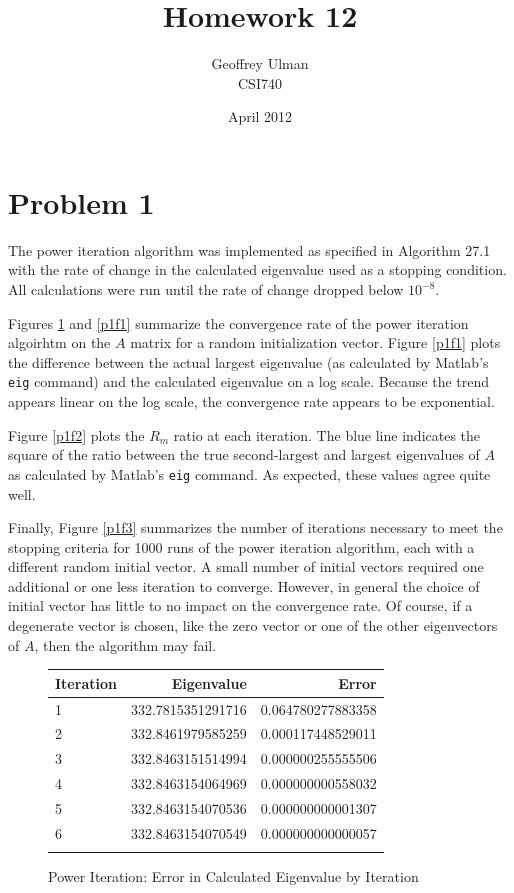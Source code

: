 \documentclass{article}
\begin{document}
\title{Homework 12}
\author{Geoffrey Ulman\\
        CSI740}
\date{April 2012}
\maketitle

\section{Problem 1}\label{p1}

The power iteration algorithm was implemented as specified in Algorithm 27.1 with the rate of change in the calculated eigenvalue used as a stopping condition. All calculations were run until the rate of change dropped below \(10^{-8}\).

Figures \ref{p1t1} and \ref{p1f1} summarize the convergence rate of the power iteration algoirhtm on the \(A\) matrix for a random initialization vector. Figure \ref{p1f1} plots the difference between the actual largest eigenvalue (as calculated by Matlab's \verb|eig| command) and the calculated eigenvalue on a log scale. Because the trend appears linear on the log scale, the convergence rate appears to be exponential.

Figure \ref{p1f2} plots the \(R_m\) ratio at each iteration. The blue line indicates the square of the ratio between the true second-largest and largest eigenvalues of \(A\) as calculated by Matlab's \verb|eig| command. As expected, these values agree quite well.

Finally, Figure \ref{p1f3} summarizes the number of iterations necessary to meet the stopping criteria for 1000 runs of the power iteration algorithm, each with a different random initial vector. A small number of initial vectors required one additional or one less iteration to converge. However, in general the choice of initial vector has little to no impact on the convergence rate. Of course, if a degenerate vector is chosen, like the zero vector or one of the other eigenvectors of \(A\), then the algorithm may fail.

\begin{figure}
\centering
\begin{tabular}{lrr}
\toprule
Iteration & Eigenvalue & Error \\
\midrule
 1 & 332.7815351291716 & 0.064780277883358 \\
 2 & 332.8461979585259 & 0.000117448529011 \\
 3 & 332.8463151514994 & 0.000000255555506 \\
 4 & 332.8463154064969 & 0.000000000558032 \\
 5 & 332.8463154070536 & 0.000000000001307 \\
 6 & 332.8463154070549 & 0.000000000000057 \\
\bottomrule
\label{p1t1}
\end{tabular}
\caption{Power Iteration: Error in Calculated Eigenvalue by Iteration}
\end{figure}
\end{document}
